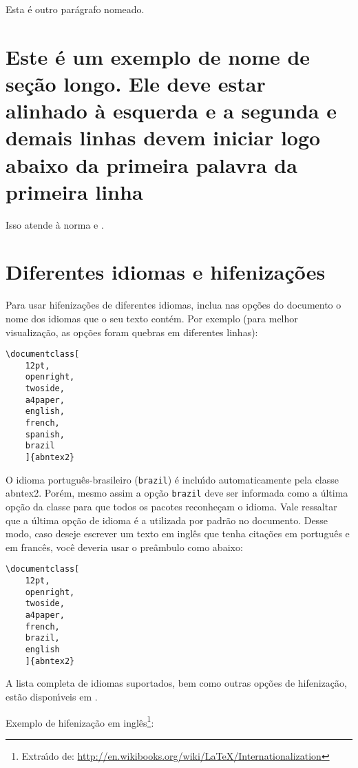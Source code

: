 Esta \'{e} outro par\'{a}grafo nomeado.

\section{Este \'{e} um exemplo de nome de se\c{c}\~{a}o longo. Ele deve estar
alinhado \`{a} esquerda e a segunda e demais linhas devem iniciar logo abaixo da
primeira palavra da primeira linha}

Isso atende \`{a} norma 
 e .

\section{Diferentes idiomas e hifeniza\c{c}\~{o}es}
\label{sec-hifenizacao}

Para usar hifeniza\c{c}\~{o}es de diferentes idiomas, inclua nas op\c{c}\~{o}es do documento o
nome dos idiomas que o seu texto cont\'{e}m. Por exemplo (para melhor
visualiza\c{c}\~{a}o, as op\c{c}\~{o}es foram quebras em diferentes linhas):

\begin{verbatim}
\documentclass[
	12pt,
	openright,
	twoside,
	a4paper,
	english,
	french,
	spanish,
	brazil
	]{abntex2}
\end{verbatim}

O idioma portugu\^{e}s-brasileiro (\texttt{brazil}) \'{e} inclu\'{\i}do automaticamente pela
classe \textsf{abntex2}. Por\'{e}m, mesmo assim a op\c{c}\~{a}o \texttt{brazil} deve ser
informada como a \'{u}ltima op\c{c}\~{a}o da classe para que todos os pacotes reconhe\c{c}am o
idioma. Vale ressaltar que a \'{u}ltima op\c{c}\~{a}o de idioma \'{e} a utilizada por padr\~{a}o no
documento. Desse modo, caso deseje escrever um texto em ingl\^{e}s que tenha
cita\c{c}\~{o}es em portugu\^{e}s e em franc\^{e}s, voc\^{e} deveria usar o pre\^{a}mbulo como abaixo:

\begin{verbatim}
\documentclass[
	12pt,
	openright,
	twoside,
	a4paper,
	french,
	brazil,
	english
	]{abntex2}
\end{verbatim}

A lista completa de idiomas suportados, bem como outras op\c{c}\~{o}es de hifeniza\c{c}\~{a}o,
est\~{a}o dispon\'{\i}veis em .

Exemplo de hifeniza\c{c}\~{a}o em ingl\^{e}s\footnote{Extra\'{\i}do de:
\url{http://en.wikibooks.org/wiki/LaTeX/Internationalization}}:

